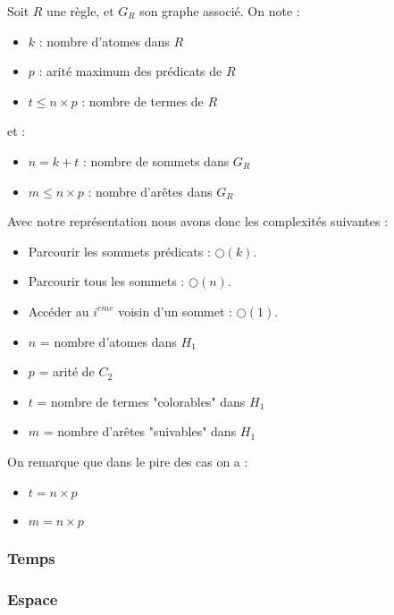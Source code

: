 
Soit $R$ une règle, et $G_R$ son graphe associé.
On note :
\begin{itemize}
	\item $k$ : nombre d'atomes dans $R$
	\item $p$ : arit\'e maximum des prédicats de $R$
	\item $t \leq n \times p$ : nombre de termes de $R$
\end{itemize}
et :
\begin{itemize}
	\item $n = k + t$ : nombre de sommets dans $G_R$
	\item $m \leq n \times p$ : nombre d'arêtes dans $G_R$
\end{itemize}

Avec notre représentation nous avons donc les complexités suivantes :
\begin{itemize}
	\item Parcourir les sommets prédicats : $\bigcirc(k)$.
	\item Parcourir tous les sommets : $\bigcirc(n)$.
	\item Acc\'eder au $i^{eme}$ voisin d'un sommet : $\bigcirc(1)$.
\end{itemize}



\begin{itemize}
	\item $n$ = nombre d'atomes dans $H_{1}$
	\item $p$ = arit\'e de $C_{2}$
	\item $t$ = nombre de termes "colorables" dans $H_{1}$
	\item $m$ = nombre d'ar\^etes "suivables" dans $H_{1}$
\end{itemize}

On remarque que dans le pire des cas on a :
\begin{itemize}
	\item $t = n \times p$
	\item $m = n \times p$
\end{itemize}

\subsubsection{Temps}
	

\subsubsection{Espace}
	

